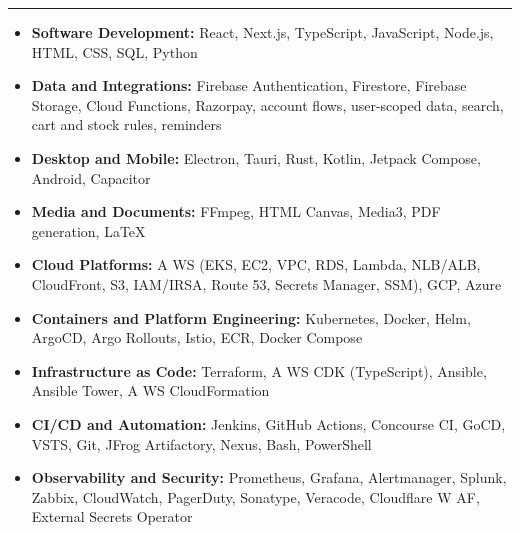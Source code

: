 \documentclass[letterpaper,10pt]{article}
\newcommand{\cvSection}[1]{\vspace{8pt}\noindent{\large\bfseries #1}\par\vspace{2pt}\hrule\vspace{4pt}}
\begin{document}
\newpage
\cvSection{T\kern0pt echnical Skills}
\begin{itemize}[label={},leftmargin=0pt,itemsep=1pt]
\item \textbf{Software Development:} React, Next.js, TypeScript, JavaScript, Node.js, HTML, CSS, SQL, Python
\item \textbf{Data and Integrations:} Firebase Authentication, Firestore, Firebase Storage, Cloud Functions, Razorpay, account flows, user-scoped data, search, cart and stock rules, reminders
\item \textbf{Desktop and Mobile:} Electron, Tauri, Rust, Kotlin, Jetpack Compose, Android, Capacitor
\item \textbf{Media and Documents:} FFmpeg, HTML Canvas, Media3, PDF generation, LaTeX
\item \textbf{Cloud Platforms:} A\kern0pt WS (EKS, EC2, VPC, RDS, Lambda, NLB/ALB, CloudFront, S3, IAM/IRSA, Route 53, Secrets Manager, SSM), GCP, Azure
\item \textbf{Containers and Platform Engineering:} Kubernetes, Docker, Helm, ArgoCD, Argo Rollouts, Istio, ECR, Docker Compose
\item \textbf{Infrastructure as Code:} Terraform, A\kern0pt WS CDK (TypeScript), Ansible, Ansible Tower, A\kern0pt WS CloudFormation
\item \textbf{CI/CD and Automation:} Jenkins, GitHub Actions, Concourse CI, GoCD, VSTS, Git, JFrog Artifactory, Nexus, Bash, PowerShell
\item \textbf{Observability and Security:} Prometheus, Grafana, Alertmanager, Splunk, Zabbix, CloudWatch, PagerDuty, Sonatype, Veracode, Cloudflare W\kern0pt AF, External Secrets Operator
\end{itemize}
\end{document}
